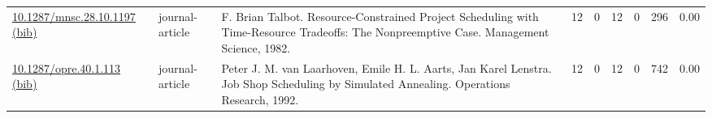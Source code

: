 {\begin{longtable}{p{5cm}lp{11cm}rrrrrr}
\href{http://dx.doi.org/10.1287/mnsc.28.10.1197}{10.1287/mnsc.28.10.1197} \href{https://www.doi2bib.org/bib/10.1287/mnsc.28.10.1197}{(bib)} & journal-article & F. Brian Talbot. Resource-Constrained Project Scheduling with Time-Resource Tradeoffs: The Nonpreemptive Case. Management Science, 1982. & 12 & 0 & 12 & 0 & 296 &  0.00\\
\href{http://dx.doi.org/10.1287/opre.40.1.113}{10.1287/opre.40.1.113} \href{https://www.doi2bib.org/bib/10.1287/opre.40.1.113}{(bib)} & journal-article & Peter J. M. van Laarhoven, Emile H. L. Aarts, Jan Karel Lenstra. Job Shop Scheduling by Simulated Annealing. Operations Research, 1992. & 12 & 0 & 12 & 0 & 742 &  0.00\\
\end{longtable}
}

